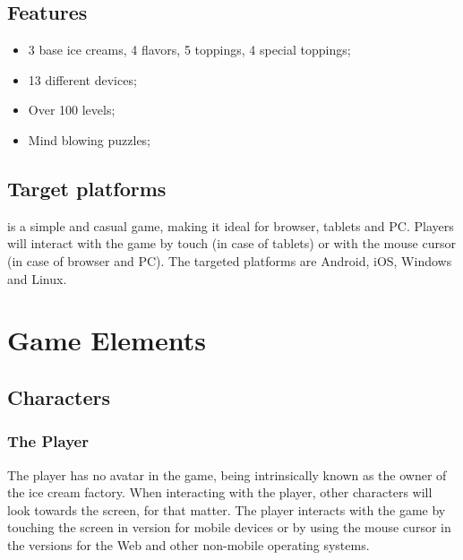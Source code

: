 \documentclass[a4paper]{scrartcl}
\begin{document}
    \subsection{Features}
        \begin{itemize}
            \item 3 base ice creams, 4 flavors, 5 toppings, 4 special toppings;
            \item 13 different devices;
            \item Over 100 levels;
            \item Mind blowing puzzles;
        \end{itemize}

    \subsection{Target platforms}
        \gamename is a simple and casual game, making it ideal for browser,
        tablets and PC. Players will interact with the game by touch (in case of
        tablets) or with the mouse cursor (in case of browser and PC). The
        targeted platforms are Android, iOS, Windows and Linux.

\section{Game Elements}

    \subsection{Characters}

        \subsubsection{The Player}
            The player has no avatar in the game, being intrinsically known as
            the owner of the ice cream factory. When interacting with the
            player, other characters will look towards the screen, for that
            matter. The player interacts with the game by touching the screen in
            version for mobile devices or by using the mouse cursor in the
            versions for the Web and other non-mobile operating systems.
\end{document}
